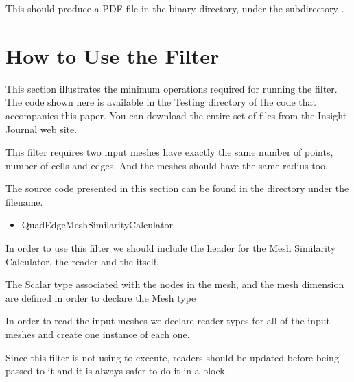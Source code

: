 \documentclass{InsightArticle}
\begin{document}
This should produce a PDF file in the binary directory, under the subdirectory
.


\section{How to Use the Filter}

This section illustrates the minimum operations required for running the filter. The code shown here 
is available in the Testing directory of the code that accompanies this paper. You can download the 
entire set of files from the Insight Journal web site.

This filter requires two input meshes have exactly the same number of points, number of cells and edges.
And the meshes should have the same radius too.

The source code presented in this section can be found in the  directory under the filename.

\begin{itemize}
\item QuadEdgeMeshSimilarityCalculator
\end{itemize}

In order to use this filter we should include the header for the Mesh Similarity Calculator, the reader and 
the  itself.

\begin{center}

\end{center}

The Scalar type associated with the nodes in the mesh, and the mesh dimension
are defined in order to declare the Mesh type

\begin{center}

\end{center}

In order to read the input meshes we declare reader types for all of the input meshes
and create one instance of each one.

\begin{center}

\end{center}

Since this filter is not using  to execute, readers should be updated before
being passed to it and it is always safer to do it in a  block.
\end{document}
